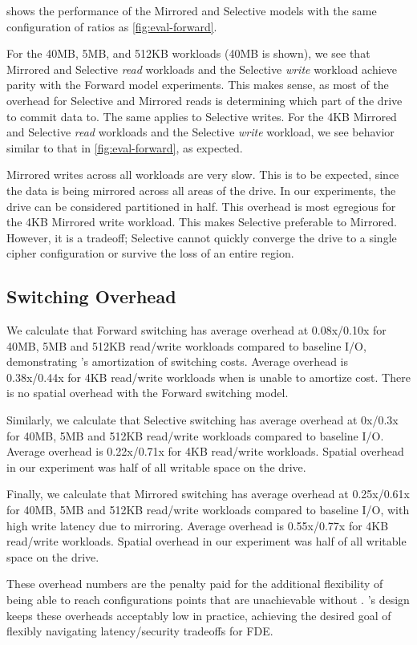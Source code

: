 

 shows the performance of the Mirrored and Selective models
with the same configuration of ratios as \cref{fig:eval-forward}.

For the 40MB, 5MB, and 512KB workloads (40MB is shown), we see that Mirrored and
Selective {\em read} workloads and the Selective {\em write} workload achieve
parity with the Forward model experiments. This makes sense, as most of the
overhead for Selective and Mirrored reads is determining which part of the drive
to commit data to. The same applies to Selective writes. For the 4KB Mirrored
and Selective {\em read} workloads and the Selective {\em write} workload, we
see behavior similar to that in \cref{fig:eval-forward}, as expected.

Mirrored writes across all workloads are very slow. This is to be expected,
since the data is being mirrored across all areas of the drive. In our
experiments, the drive can be considered partitioned in half. This overhead is
most egregious for the 4KB Mirrored write workload. This makes Selective
preferable to Mirrored. However, it is a tradeoff; Selective cannot quickly
converge the drive to a single cipher configuration or survive the loss of an
entire region.


\subsection{Switching Overhead}\label{subsec:eval-overhead}

We calculate that Forward switching has average overhead at 0.08x/0.10x for
40MB, 5MB and 512KB read/write workloads compared to baseline I/O, demonstrating
\sys's amortization of switching costs. Average overhead is\\0.38x/0.44x for 4KB
read/write workloads when \sys is unable to amortize cost. There is no spatial
overhead with the Forward switching model.

Similarly, we calculate that Selective switching has average overhead at 0x/0.3x
for 40MB, 5MB and 512KB read/write workloads compared to baseline I/O. Average
overhead is 0.22x/0.71x for 4KB read/write workloads. Spatial overhead in our
experiment was half of all writable space on the drive.

Finally, we calculate that Mirrored switching has average overhead at
0.25x/0.61x for 40MB, 5MB and 512KB read/write workloads compared to baseline
I/O, with high write latency due to mirroring. Average overhead is 0.55x/0.77x
for 4KB read/write workloads. Spatial overhead in our experiment was half of all
writable space on the drive.

These overhead numbers are the penalty paid for the additional flexibility of
being able to reach configurations points that are unachievable without \sys.
\sys's design keeps these overheads acceptably low in practice, achieving the
desired goal of flexibly navigating latency/security tradeoffs for FDE.
